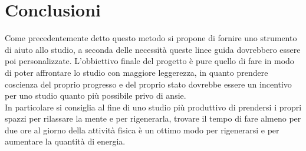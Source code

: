 \documentclass[11pt,a4paper]{article}
\begin{document}
\section{Conclusioni}
Come precedentemente detto questo metodo si propone di fornire uno strumento di aiuto allo studio, a seconda delle necessità queste linee guida dovrebbero essere poi personalizzate. L'obbiettivo finale del progetto è pure quello di fare in modo di poter affrontare lo studio con maggiore leggerezza, in quanto prendere coscienza del proprio progresso e del proprio stato dovrebbe essere un incentivo per uno studio quanto più possibile privo di ansie.\\
In particolare si consiglia al fine di uno studio più produttivo di prendersi i propri spazzi per rilassare la mente e per rigenerarla, trovare il tempo di fare almeno per due ore al giorno della attività fisica è un ottimo modo per rigenerarsi e per aumentare la quantità di energia.\\

	
\end{document}
